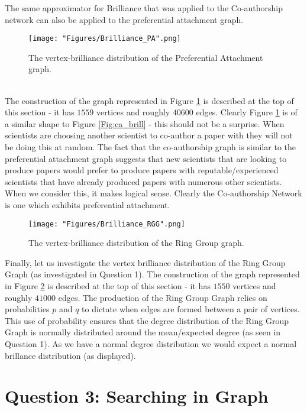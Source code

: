 \documentclass[12pt, a4paper]{article}
\begin{document}
The same approximator for Brilliance that was applied to the Co-authorship network can also be applied to the preferential attachment graph.
 \begin{figure}[!htb]
     \centering
     \texttt{[image: "Figures/Brilliance\_PA".png]}
     \caption{The vertex-brilliance distribution of the Preferential Attachment graph.}
     \label{Fig:pa_brill}
\end{figure}
\\
The construction of the graph represented in Figure \ref{Fig:pa_brill} is described at the top of this section - it has $1559$ vertices and roughly $40600$ edges. Clearly Figure \ref{Fig:pa_brill} is of a similar shape to Figure \ref{Fig:ca_brill} - this should not be a surprise. When scientists are choosing another scientist to co-author a paper with they will not be doing this at random. The fact that the co-authorship graph is similar to the preferential attachment graph suggests that new scientists that are looking to produce papers would prefer to produce papers with reputable/experienced scientists that have already produced papers with numerous other scientists. When we consider this, it makes logical sense. Clearly the Co-authorship Network is one which exhibits preferential attachment.\\
\newpage
 \begin{figure}[!htb]
     \centering
     \texttt{[image: "Figures/Brilliance\_RGG".png]}
     \caption{The vertex-brilliance distribution of the Ring Group graph.}
     \label{Fig:rgg_brill}
\end{figure}
Finally, let us investigate the vertex brilliance distribution of the Ring Group Graph (as investigated in Question 1). The construction of the graph represented in Figure \ref{Fig:rgg_brill} is described at the top of this section - it has $1550$ vertices and roughly $41000$ edges. The production of the Ring Group Graph relies on probabilities $p$ and $q$ to dictate when edges are formed between a pair of vertices. This use of probability ensures that the degree distribution of the Ring Group Graph is normally distributed around the mean/expected degree (as seen in Question 1). As we have a normal degree distribution we would expect a normal brillance distribution (as displayed). \\
\newpage


\section*{Question 3: Searching in Graph }
\end{document}
